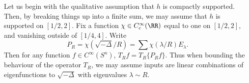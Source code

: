 Let us begin with the qualitative assumption that $h$ is compactly supported. Then, by breaking things up into a finite sum, we may assume that $h$ is supported on $[1/2,2]$. Fix a function $\chi \in C_c^\infty(\RR)$ equal to one on $[1/2,2]$, and vanishing outside of $[1/4,4]$. Write
%
\[ P_R = \chi \left( \sqrt{-\Delta} / R \right) = \sum \chi(\lambda / R) E_\lambda. \]
%
Then for any function $f \in C^\infty(S^n)$, $T_R f = T_R \{ P_R f \}$. Thus when bounding the behaviour of the operator $T_R$, we may assume inputs are linear combinations of eigenfunctions to $\sqrt{-\Delta}$ with eigenvalues $\lambda \sim R$.





